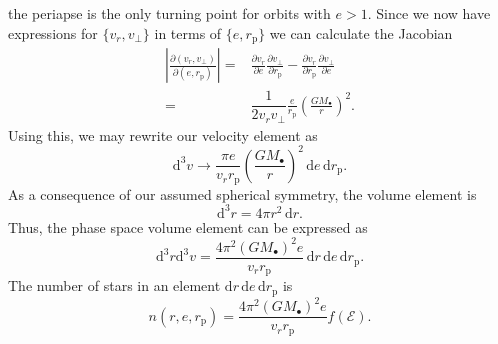 \documentclass[useAMS,usedcolumn,usegraphicx,usenatbib]{mn2e}
\newcommand{\sub}[1]{\ensuremath{_\mathrm{#1}}}
\newcommand{\dd}{\ensuremath{\mathrm{d}}}
\newcommand{\partialdiff}[2]{\ensuremath{\frac{\partial {#1}}{\partial {#2}}}}
\newcommand{\recip}[1]{\ensuremath{\dfrac{1}{#1}}}
\begin{document}
the periapse is the only turning point for orbits with $e > 1$. Since we now have expressions for $\{v_r, v_\perp\}$ in terms of $\{e, r\sub{p}\}$ we can calculate the Jacobian
\begin{align}
\left|\frac{\partial(v_r, v_\perp)}{\partial(e, r\sub{p})}\right| = {} & \partialdiff{v_r}{e}\partialdiff{v_\perp}{r\sub{p}} - \partialdiff{v_r}{r\sub{p}}\partialdiff{v_\perp}{e} \\
 = {} & \recip{2v_rv_\perp}\frac{e}{r\sub{p}}\left(\frac{GM_\bullet}{r}\right)^2.
\end{align}
Using this, we may rewrite our velocity element as
\begin{equation}
\dd^3v \rightarrow \frac{\pi e}{v_rr\sub{p}}\left(\frac{GM_\bullet}{r}\right)^2\,\dd e \,\dd r\sub{p}.
\end{equation}
As a consequence of our assumed spherical symmetry, the volume element is
\begin{equation}
\dd^3r = 4\pi r^2 \,\dd r.
\end{equation}
Thus, the phase space volume element can be expressed as
\begin{equation}
\dd^3r\dd^3v = \frac{4\pi^2(GM_\bullet)^2e}{v_rr\sub{p}}\,\dd r\,\dd e \,\dd r\sub{p}.
\end{equation}
The number of stars in an element $\dd r\,\dd e\,\dd r\sub{p}$ is
\begin{equation}
n(r, e, r\sub{p}) = \frac{4\pi^2(GM_\bullet)^2e}{v_rr\sub{p}}f(\mathcal{E}).
\end{equation}
\end{document}
